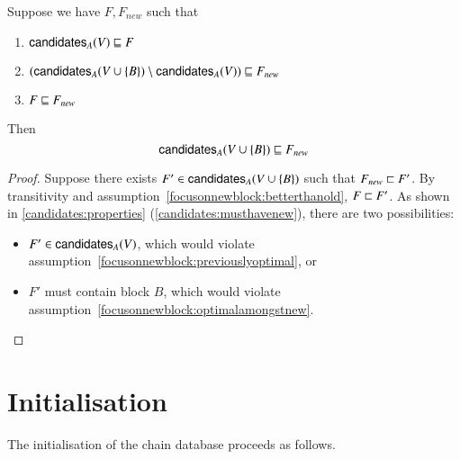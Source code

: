 \begin{lemma}
\label{focusonnewblock}
Suppose we have $F, F_\mathit{new}$ such that
\begin{enumerate}
\item \label{focusonnewblock:previouslyoptimal}
$\mathsf{candidates}_A(V) \mathrel{\sqsubseteq} F$
\item \label{focusonnewblock:optimalamongstnew}
$(\mathsf{candidates}_A(V \cup \{B\}) \setminus \mathsf{candidates}_A(V)) \mathrel{\sqsubseteq} F_\mathit{new}$
\item \label{focusonnewblock:betterthanold}
$F \mathrel{\sqsubseteq} F_\mathit{new}$
\end{enumerate}
Then
\begin{equation*}
\mathsf{candidates}_A(V \cup \{B\}) \mathrel{\sqsubseteq} F_\mathit{new}
\end{equation*}
\end{lemma}

\begin{proof}
Suppose there exists $F' \in \mathsf{candidates}_A(V \cup \{B\})$ such that
$F_\mathit{new} \mathrel{\sqsubset} F'$. By transitivity and
assumption~\ref{focusonnewblock:betterthanold}, $F \mathrel{\sqsubset} F'$. As
shown in \cref{candidates:properties} (\cref{candidates:musthavenew}), there are two possibilities:

\begin{itemize}
\item $F' \in \mathsf{candidates}_A(V)$, which would violate
assumption~\cref{focusonnewblock:previouslyoptimal}, or
\item $F'$ must contain block $B$, which would violate
assumption~\cref{focusonnewblock:optimalamongstnew}.
\end{itemize}
\end{proof}

\section{Initialisation}
\label{chainsel:init}

The initialisation of the chain database proceeds as follows.

